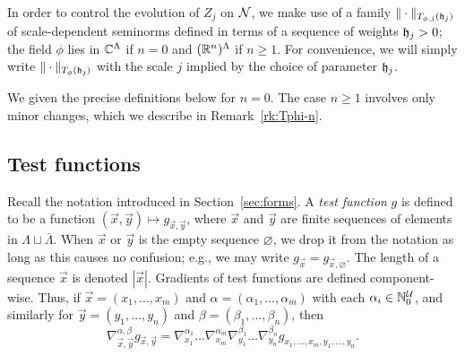 In order to control the evolution of $Z_j$ on $\mathcal{N}$, we make use of a family
$\|\cdot\|_{T_{\phi,j}(\mathfrak{h}_j)}$ of scale-dependent seminorms defined in terms of a
sequence of weights $\mathfrak{h}_j > 0$; the field $\phi$ lies in $\mathbb{C}^\Lambda$ if $n = 0$ and
$({\mathbb R}^n)^\Lambda$ if $n \ge 1$. For convenience,
we will simply write $\|\cdot\|_{T_\phi(\mathfrak{h}_j)}$ with the scale $j$ implied by the
choice of parameter $\mathfrak{h}_j$.

We given the precise definitions below for $n = 0$. The case $n \ge 1$ involves only
minor changes, which we describe in Remark~\ref{rk:Tphi-n}.


\subsection{Test functions}

Recall the notation introduced in Section~\ref{sec:forms}.
A \emph{test function} $g$ is defined to be a function $(\vec x, \vec y) \mapsto g_{\vec x,\vec y}$,
where $\vec x$ and $\vec y$ are finite sequences of elements in $\Lambda \sqcup \bar\Lambda$.
When $\vec x$ or $\vec y$ is the empty sequence $\varnothing$,
we drop it from the notation as long as this causes no confusion;
e.g., we may write $g_{\vec x} = g_{\vec x,\varnothing}$.
The length of a sequence $\vec x$ is denoted $|\vec x|$.
Gradients of test functions are defined component-wise.
Thus, if $\vec x = (x_1, \ldots, x_m)$
and $\alpha = (\alpha_1, \ldots, \alpha_m)$
with each $\alpha_i \in {\mathbb N}_0^{\mathcal{U}}$, and similarly for $\vec y=(y_1,\ldots,y_n)$ and
$\beta=(\beta_1,\ldots,\beta_n)$,
then
\begin{equation}
\nabla^{\alpha,\beta}_{\vec x,\vec y} g_{\vec x,\vec y}
  =
\nabla^{\alpha_1}_{x_1} \ldots \nabla^{\alpha_m}_{x_m}
\nabla^{\beta_1}_{y_1} \ldots \nabla^{\beta_n}_{y_n}  g_{x_1,\ldots,x_m,y_1,\ldots,y_n}.
\end{equation}

